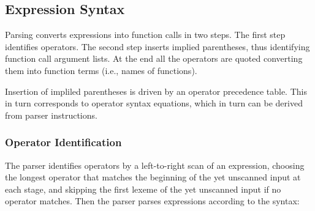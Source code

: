 \documentclass[12pt]{article}
\begin{document}
\subsection{Expression Syntax}
\label{EXPRESSION-SYNTAX}

Parsing converts expressions into function calls in two steps.
The first step identifies operators.  The second step inserts
implied parentheses, thus identifying function call argument lists.
At the end all the operators are quoted converting them into
function terms (i.e., names of functions).

Insertion of impliled parentheses is driven by an operator
precedence table.  This in turn corresponds to operator
syntax equations, which in turn can be derived from parser
instructions.

\subsubsection{Operator Identification}
\label{OPERATOR-IDENTIFICATION}

The parser identifies operators by a left-to-right scan of
an expression, choosing the longest operator that matches the
beginning of the yet unscanned input at each stage, and skipping
the first lexeme of the yet unscanned input if no operator matches.
Then the parser parses expressions according to the syntax:
\end{document}
